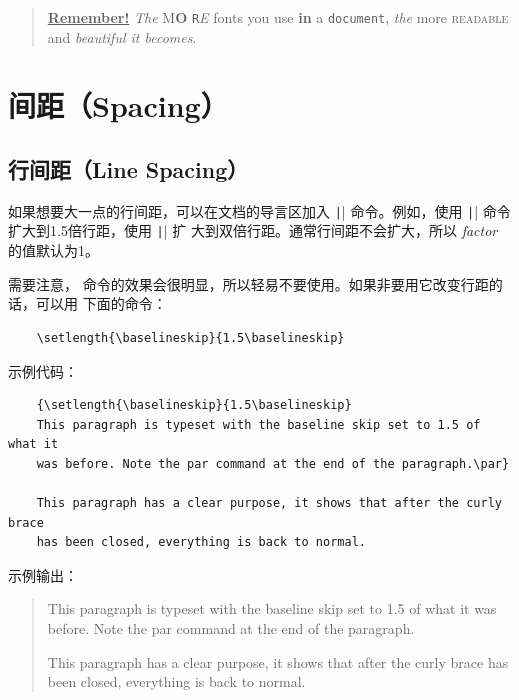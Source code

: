 \documentclass[UTF8]{ctexart}
\begin{document}
\begin{quote}
  \underline{\textbf{Remember\Huge!}} \textit{The}
  \textsf{M\textbf{\LARGE O} \texttt{R}\textsl{E}} fonts \Huge you
  \tiny use \footnotesize \textbf{in} a \small \texttt{document},
  \large \textit{the} \normalsize more \textsc{readable} and
  \textsl{\textsf{beautiful} it bec\large o\Large m\LARGE e\huge s}.
\end{quote}

\section{间距（Spacing）}
\subsection{行间距（Line Spacing）}
如果想要大一点的行间距，可以在文档的导言区加入 \texttt|\linespread{factor}| 命令。例如，使用
\texttt|\linespread{1.3}| 命令扩大到1.5倍行距，使用 \texttt|\linespread{1.6}| 扩
大到双倍行距。通常行间距不会扩大，所以 \emph{factor} 的值默认为1。

需要注意，\texttt{\linespread} 命令的效果会很明显，所以轻易不要使用。如果非要用它改变行距的话，可以用
下面的命令：
\begin{verbatim}
    \setlength{\baselineskip}{1.5\baselineskip}
\end{verbatim}

示例代码：
\begin{verbatim}
    {\setlength{\baselineskip}{1.5\baselineskip}
    This paragraph is typeset with the baseline skip set to 1.5 of what it
    was before. Note the par command at the end of the paragraph.\par}

    This paragraph has a clear purpose, it shows that after the curly brace
    has been closed, everything is back to normal.
\end{verbatim}

示例输出：
\begin{quote}
    {\setlength{\baselineskip}{1.5\baselineskip}
    This paragraph is typeset with the baseline skip set to 1.5 of what it
    was before. Note the par command at the end of the paragraph.\par}

    This paragraph has a clear purpose, it shows that after the curly brace
    has been closed, everything is back to normal.
\end{quote}
\end{document}
